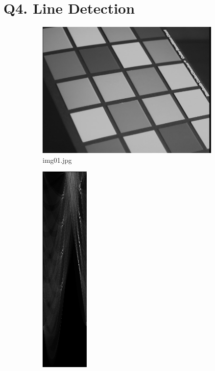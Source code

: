 \documentclass{article}
\begin{document}
\section*{Q4. Line Detection}

	\begin{figure}[htb!]
		\centering
		\begin{subfigure}[t]{0.3\textwidth}
			\centering
			\includegraphics[width=\textwidth]{img/img01.jpg}
			\caption{\label{fig:img-01}img01.jpg}
		\end{subfigure}
		\hfill
		\begin{subfigure}[t]{0.3\textwidth}
			\centering
			\includegraphics[height=\textwidth]{img/hough01.png}

\end{subfigure}
\end{figure}
\end{document}
